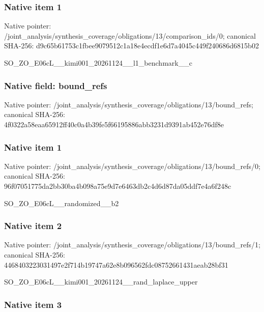 \documentclass[10pt,a4paper]{article}
\begin{document}
\subsubsection{Native item 1}


Native pointer: /joint\_analysis/synthesi\allowbreak{}s\_coverage/obligations/1\allowbreak{}3/comparison\_ids/0; canonical SHA-256: d9c65b61753c1fbee9079512\allowbreak{}c1a18e4ecdf1e6d7a4045c44\allowbreak{}9f240686d6815b02


SO\_ZO\_E06cL\_\_kimi001\_202\allowbreak{}61124\_\_l1\_benchmark\_\_c


\subsubsection{Native field: bound\_refs}


Native pointer: /joint\_analysis/synthesi\allowbreak{}s\_coverage/obligations/1\allowbreak{}3/bound\_refs; canonical SHA-256: 4f0322a58eaa65912ff40c0a\allowbreak{}4b39fe5f66195886abb3231d\allowbreak{}9391ab452e76df8e



\subsubsection{Native item 1}


Native pointer: /joint\_analysis/synthesi\allowbreak{}s\_coverage/obligations/1\allowbreak{}3/bound\_refs/0; canonical SHA-256: 96f07051775da2bb30ba4b09\allowbreak{}8a75e9d7e6463db2c4d6d87d\allowbreak{}a05ddf7e4a6f248c


SO\_ZO\_E06cL\_\_randomized\_\_b2


\subsubsection{Native item 2}


Native pointer: /joint\_analysis/synthesi\allowbreak{}s\_coverage/obligations/1\allowbreak{}3/bound\_refs/1; canonical SHA-256: 4468403223031497e2f714b1\allowbreak{}9747a62e8b096562fdc08752\allowbreak{}661431aeab28bf31


SO\_ZO\_E06cL\_\_kimi001\_202\allowbreak{}61124\_\_rand\_laplace\_uppe\allowbreak{}r


\subsubsection{Native item 3}
\end{document}
